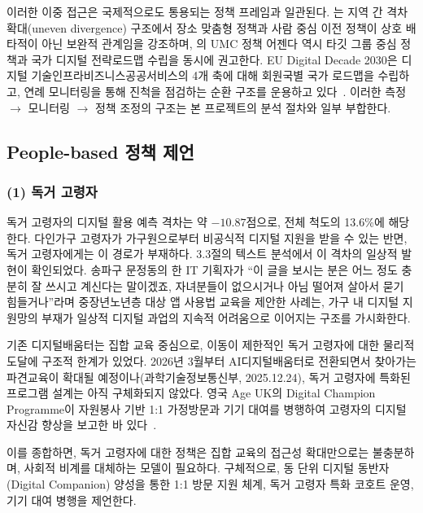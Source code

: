 이러한 이중 접근은 국제적으로도 통용되는 정책 프레임과 일관된다. \citet{OECD2025}는 지역 간 격차 확대(uneven divergence) 구조에서 장소 맞춤형 정책과 사람 중심 이전 정책이 상호 배타적이 아닌 보완적 관계임을 강조하며, \citet{ITU2024}의 UMC 정책 어젠다 역시 타깃 그룹 중심 정책과 국가 디지털 전략\textperiodcentered{}로드맵 수립을 동시에 권고한다. EU Digital Decade 2030은 디지털 기술\textperiodcentered{}인프라\textperiodcentered{}비즈니스\textperiodcentered{}공공서비스의 4개 축에 대해 회원국별 국가 로드맵을 수립하고, 연례 모니터링을 통해 진척을 점검하는 순환 구조를 운용하고 있다~\citep{EuropeanCommission2025}. 이러한 측정 $\rightarrow$ 모니터링 $\rightarrow$ 정책 조정의 구조는 본 프로젝트의 분석 절차와 일부 부합한다.

\subsection{People-based 정책 제언}
\label{subsec:4-2}

\subsubsection*{(1) 독거 고령자}

독거 고령자의 디지털 활용 예측 격차는 약 $-10.87$점으로, 전체 척도의 13.6\%에 해당한다. 다인가구 고령자가 가구원으로부터 비공식적 디지털 지원을 받을 수 있는 반면, 독거 고령자에게는 이 경로가 부재하다. 3.3절의 텍스트 분석에서 이 격차의 일상적 발현이 확인되었다. 송파구 문정동의 한 IT 기획자가 ``이 글을 보시는 분은 어느 정도 충분히 잘 쓰시고 계신다는 말이겠죠, 자녀분들이 없으시거나 아님 떨어져 살아서 묻기 힘들거나''라며 중장년\textperiodcentered{}노년층 대상 앱 사용법 교육을 제안한 사례는, 가구 내 디지털 지원망의 부재가 일상적 디지털 과업의 지속적 어려움으로 이어지는 구조를 가시화한다.

기존 디지털배움터는 집합 교육 중심으로, 이동이 제한적인 독거 고령자에 대한 물리적 도달에 구조적 한계가 있었다. 2026년 3월부터 AI디지털배움터로 전환되면서 찾아가는 파견교육이 확대될 예정이나(과학기술정보통신부, 2025.12.24), 독거 고령자에 특화된 프로그램 설계는 아직 구체화되지 않았다. 영국 Age UK의 Digital Champion Programme이 자원봉사 기반 1:1 가정방문과 기기 대여를 병행하여 고령자의 디지털 자신감 향상을 보고한 바 있다~\citep{AgeUK2023}.

이를 종합하면, 독거 고령자에 대한 정책은 집합 교육의 접근성 확대만으로는 불충분하며, 사회적 비계를 대체하는 모델이 필요하다. 구체적으로, 동 단위 디지털 동반자(Digital Companion) 양성을 통한 1:1 방문 지원 체계, 독거 고령자 특화 코호트 운영, 기기 대여 병행을 제언한다.

